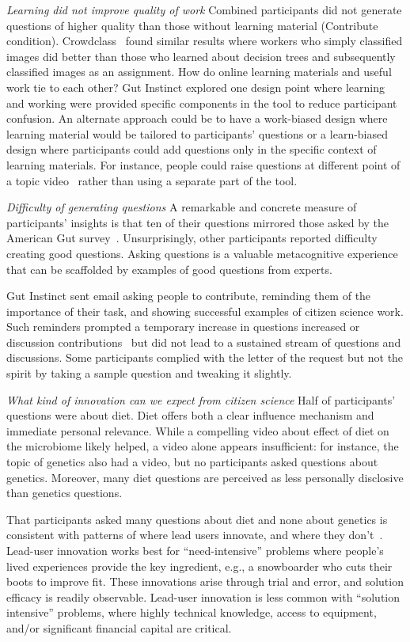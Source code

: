 \textit{Learning did not improve quality of work}
Combined participants did not generate questions of higher quality than those without learning material (Contribute condition). Crowdclass~\cite{Lee2016} found similar results where workers who simply classified images did better than those who learned about decision trees and subsequently classified images as an assignment. How do online learning materials and useful work tie to each other? Gut Instinct explored one design point where learning and working were provided specific components in the tool to reduce participant confusion. An alternate approach could be to have a work-biased design where learning material would be tailored to participants’ questions or a learn-biased design where participants could add questions only in the specific context of learning materials. For instance, people could raise questions at different point of a topic video~\cite{Lee2015b} rather than using a separate part of the tool.
 
\textit{Difficulty of generating questions}
A remarkable and concrete measure of participants’ insights is that ten of their questions mirrored those asked by the American Gut survey~\cite{KnightLab2016}. Unsurprisingly, other participants reported difficulty creating good questions. Asking questions is a valuable metacognitive experience that can be scaffolded by examples of good questions from experts. 

Gut Instinct sent email asking people to contribute, reminding them of the importance of their task, and showing successful examples of citizen science work. Such reminders 
prompted a temporary increase in questions increased or discussion contributions~\cite{Kotturi2015} but did not lead to a sustained stream of questions and discussions. Some participants complied with the letter of the request but not the spirit by taking a sample question and tweaking it slightly.

\textit{What kind of innovation can we expect from citizen science}
Half of participants’ questions were about diet. Diet offers both a clear influence mechanism and immediate personal relevance. While a compelling video about effect of diet on the microbiome likely helped, a video alone appears insufficient: for instance, the topic of genetics also had a video, but no participants asked questions about genetics. Moreover, many diet questions are perceived as less personally disclosive than genetics questions.
 
That participants asked many questions about diet and none about genetics is consistent with patterns of where lead users innovate, and where they don’t~\cite{VonHippel2005a}. Lead-user innovation works best for “need-intensive” problems where people’s lived experiences provide the key ingredient, e.g., a snowboarder who cuts their boots to improve fit. These innovations arise through trial and error, and solution efficacy is readily observable. Lead-user innovation is less common with “solution intensive” problems, where highly technical knowledge, access to equipment, and/or significant financial capital are critical. 
 
